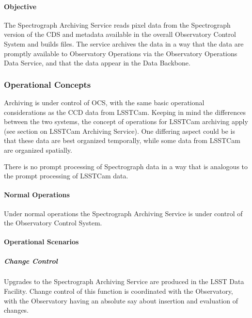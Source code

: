 \paragraph{Objective}

The Spectrograph Archiving Service reads pixel data from the Spectrograph version of
the CDS and metadata available in the overall Observatory Control System and builds files.
The service archives the data in a way that the data are promptly available to Observatory
Operations via the Observatory Operations Data Service, and that the data appear in the Data
Backbone.

\subsubsection{Operational Concepts}

Archiving is under control of OCS, with the same basic operational
considerations as the CCD data from LSSTCam. Keeping
in mind the differences between the two systems, the concept of
operations for LSSTCam archiving apply (see section on LSSTCam Archiving Service).
One differing aspect could be is that these data are best organized temporally,
while some data from LSSTCam are organized spatially.

There is no prompt processing of Spectrograph data in a way that is
analogous to the prompt processing of LSSTCam data.

\paragraph{Normal Operations}

Under normal operations the Spectrograph Archiving Service is under control of the Observatory
Control System.

\paragraph{Operational Scenarios}

\subparagraph{Change Control}
Upgrades to the Spectrograph Archiving Service are produced in the LSST Data Facility.
Change control of this function is coordinated with the Observatory, with the Observatory
having an absolute say about insertion and evaluation of changes.
